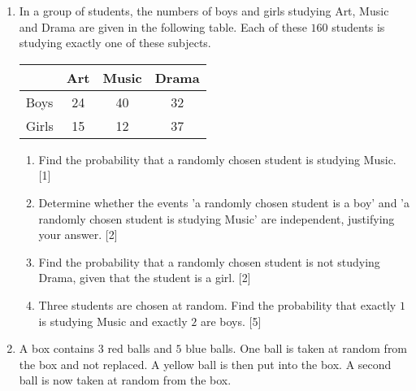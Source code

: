 \begin{enumerate}

\item In a group of students, the numbers of boys and girls studying Art, Music and Drama are given in the following table. Each of these $160$ students is studying exactly one of these subjects.

\begin{table}[!htpb]
	\centering
	\begin{tabular}{l|c|c|c|}
		\cline{2-4}
		& Art & Music & Drama \\ \hline
		\multicolumn{1}{|l|}{Boys}  & 24  & 40    & 32    \\ \hline
		\multicolumn{1}{|l|}{Girls} & 15  & 12    & 37    \\ \hline
	\end{tabular}
\end{table}

\begin{enumerate}[label=(\roman*)]
	\item Find the probability that a randomly chosen student is studying Music. \hfill[1]
	\item Determine whether the events 'a randomly chosen student is a boy' and 'a randomly chosen
	student is studying Music' are independent, justifying your answer. \hfill [2]
	\item Find the probability that a randomly chosen student is not studying Drama, given that the student	is a girl. \hfill [2]
	\item Three students are chosen at random. Find the probability that exactly $1$ is studying Music and 	exactly $2$ are boys. \hfill  [5]
\end{enumerate}




\item A box contains $3$ red balls and $5$ blue balls. One ball is taken at random from the box and not replaced. A yellow ball is then put into the box. A second ball is now taken at random from the box.


\end{enumerate}
